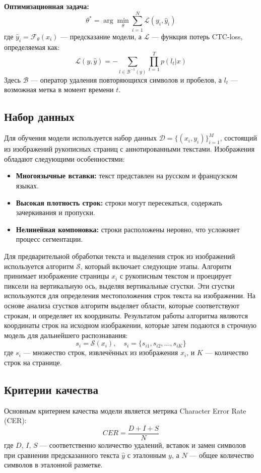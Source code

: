 \documentclass{article}
\begin{document}
    \textbf{Оптимизационная задача:}
    \[
    \theta^* = \arg \min_{\theta} \sum_{i=1}^{N} \mathcal{L}(y_i, \hat{y}_i)
    \]
    где $\hat{y}_i = \mathcal{F}_{\theta}(x_i)$ — предсказание модели, а $\mathcal{L}$ — функция потерь CTC-loss, определяемая как:
    \[
    \mathcal{L}(y, \hat{y}) = - \sum_{l \in \mathcal{B}^{-1}(y)} \prod_{t=1}^{T} p(l_t | x)
    \]
    Здесь $\mathcal{B}$ — оператор удаления повторяющихся символов и пробелов, а $l_t$ — возможная метка в момент времени $t$.

    \subsection{Набор данных}
    Для обучения модели используется набор данных $\mathcal{D} = \{(x_i, y_i)\}_{i=1}^{M}$, состоящий из изображений рукописных страниц с аннотированными текстами. Изображения обладают следующими особенностями:
    \begin{itemize}
        \item \textbf{Многоязычные вставки:} текст представлен на русском и французском языках.
        \item \textbf{Высокая плотность строк:} строки могут пересекаться, содержать зачеркивания и пропуски.
        \item \textbf{Нелинейная компоновка:} строки расположены неровно, что усложняет процесс сегментации.
    \end{itemize}

    Для предварительной обработки текста и выделения строк из изображений используется алгоритм $\mathcal{S}$, который включает следующие этапы. Алгоритм принимает изображение страницы $x_i$ с рукописным текстом и проецирует пиксели на вертикальную ось, выделяя вертикальные сгустки. Эти сгустки используются для определения местоположения строк текста на изображении. На основе анализа сгустков алгоритм выделяет области, которые соответствуют строкам, и определяет их координаты. Результатом работы алгоритма являются координаты строк на исходном изображении, которые затем подаются в строчную модель для дальнейшего распознавания:
    \[
    s_i = \mathcal{S}(x_i), \quad s_i = \{s_{i1}, s_{i2}, \dots, s_{iK}\}
    \]
    где $s_i$ — множество строк, извлечённых из изображения $x_i$, и $K$ — количество строк на странице.


    \subsection{Критерии качества}
    Основным критерием качества модели является метрика Character Error Rate (CER):
    \[
    CER = \frac{D + I + S}{N}
    \]
    где $D$, $I$, $S$ — соответственно количество удалений, вставок и замен символов при сравнении предсказанного текста $\hat{y}$ с эталонным $y$, а $N$ — общее количество символов в эталонной разметке.
\end{document}
